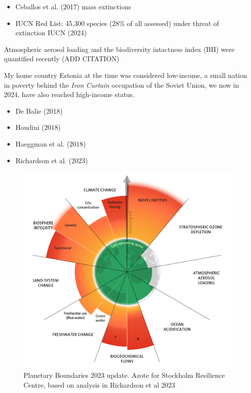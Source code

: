 \documentclass[
  letterpaper,
  DIV=11,
  numbers=noendperiod]{scrartcl}
\providecommand{\tightlist}{%
  \setlength{\itemsep}{0pt}\setlength{\parskip}{0pt}}\usepackage{longtable,booktabs,array}
\begin{document}
\begin{itemize}
\tightlist
\item
  Ceballos et al. (2017) mass extinctions
\item
  IUCN Red List: 45,300 species (28\% of all assessed) under threat of
  extinction IUCN (2024)
\end{itemize}

Atmospheric aerosol loading and the biodiversity intactness index (BII)
were quantified recently (ADD CITATION)

My home country Estonia at the time was considered low-income, a small
nation in poverty behind the \emph{Iron Curtain} occupation of the
Soviet Union, we now in 2024, have also reached high-income status.

\begin{itemize}
\item
  De Balie (2018)
\item
  Houdini (2018)
\item
  Haeggman et al. (2018)
\item
  Richardson et al. (2023)
\end{itemize}

\begin{figure}[H]

{\centering \includegraphics[width=1\linewidth,height=\textheight,keepaspectratio]{./images/sustainability/planetary-boundaries-2023.png}

}

\caption{Planetary Boundaries 2023 update. Azote for Stockholm
Resilience Centre, based on analysis in Richardson et al 2023}

\end{figure}%
\end{document}
